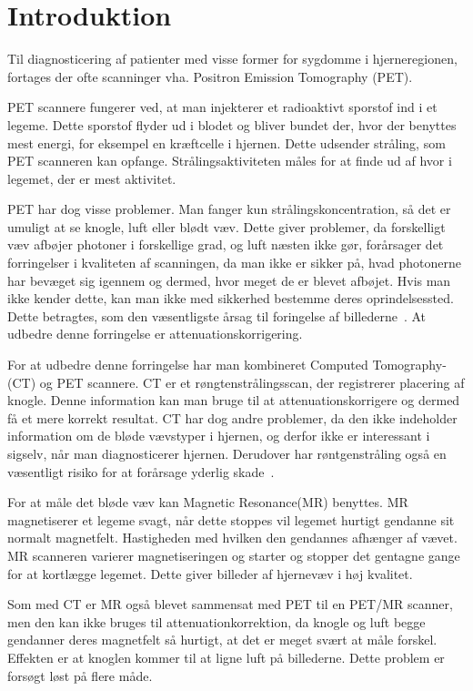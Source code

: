 \section{Introduktion}

Til diagnosticering af patienter med visse former for sygdomme i hjerneregionen, fortages der ofte scanninger vha. Positron Emission Tomography (PET). 

PET scannere fungerer ved, at man injekterer et radioaktivt sporstof
ind i et legeme. Dette sporstof flyder ud i blodet og bliver bundet
der, hvor der benyttes mest energi, for eksempel en kræftcelle i
hjernen. Dette udsender stråling, som PET scanneren kan opfange.
Strålingsaktiviteten måles for at finde ud af hvor i legemet, der er
mest aktivitet.

PET har dog visse problemer. Man fanger kun strålingskoncentration,
så det er umuligt at se knogle, luft eller blødt væv. Dette giver
problemer, da forskelligt væv afbøjer photoner i forskellige grad,
og luft næsten ikke gør, forårsager det forringelser i kvaliteten
af scanningen, da man ikke er sikker på, hvad photonerne har bevæget
sig igennem og dermed, hvor meget de er blevet afbøjet. Hvis man ikke
kender dette, kan man ikke med sikkerhed bestemme deres oprindelsessted.
Dette betragtes, som den væsentligste årsag til foringelse af
billederne~\cite{vigtighedAfAttenuation}. At udbedre denne forringelse er
attenuationskorrigering.

For at udbedre denne forringelse har man kombineret Computed
Tomo\-graphy- (CT) og PET scannere. CT er et røngtenstrålingsscan,
der registrerer placering af knogle. Denne information kan man bruge
til at attenuationskorrigere og dermed få et mere korrekt resultat.
CT har dog andre problemer, da den ikke indeholder information om de
bløde vævstyper i hjernen, og derfor ikke er interessant i sigselv, når
man diagnosticerer hjernen. Derudover har røntgenstråling også
en væsentligt risiko for at forårsage yderlig skade~\cite{skadeligCT}.

For at måle det bløde væv kan Magnetic Resonance(MR) benyttes.
MR magnetiserer et legeme svagt, når dette stoppes vil legemet hurtigt
gendanne sit normalt magnetfelt. Hastigheden med hvilken den gendannes
afhænger af vævet. MR scanneren varierer magnetiseringen og starter og
stopper det gentagne gange for at kortlægge legemet. Dette giver billeder
af hjernevæv i høj kvalitet.

Som med CT er MR også blevet sammensat med PET til en PET/MR scanner,
men den kan ikke bruges til attenuationkorrektion, da knogle og luft
begge gendanner deres magnetfelt så hurtigt, at det er meget svært at
måle forskel. Effekten er at knoglen kommer til at ligne luft på
billederne. Dette problem er forsøgt løst på flere måde.


